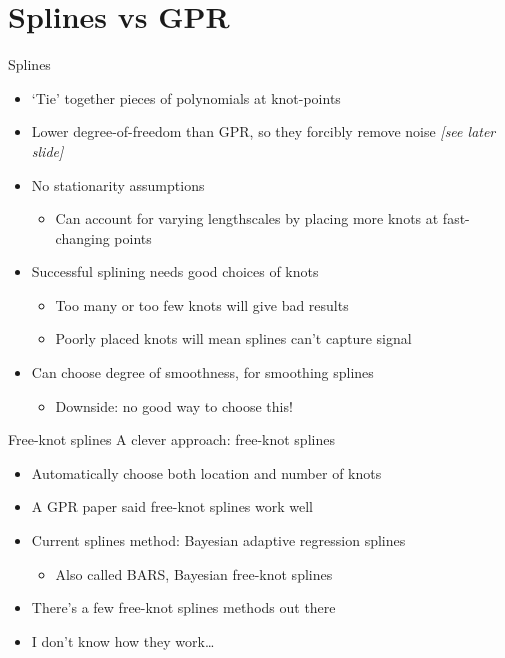 \documentclass[presentation]{beamer}
\begin{document}
\section{Splines vs GPR}
\label{sec:org5209505}
\begin{frame}[label={sec:org2b74fd0}]{Splines}
\begin{itemize}[<+->]
\item `Tie' together pieces of polynomials at knot-points
\item Lower degree-of-freedom than GPR, so they forcibly remove noise \emph{[see later slide]}
\item No stationarity assumptions
\begin{itemize}
\item Can account for varying lengthscales by placing more knots at fast-changing points
\end{itemize}
\item Successful splining needs good choices of knots
\begin{itemize}
\item Too many or too few knots will give bad results
\item Poorly placed knots will mean splines can't capture signal
\end{itemize}
\item Can choose degree of smoothness, for smoothing splines
\begin{itemize}
\item Downside: no good way to choose this!
\end{itemize}
\end{itemize}
\end{frame}


\begin{frame}[label={sec:orgcea1bef}]{Free-knot splines}
A clever approach: free-knot splines
\begin{itemize}[<+->]
\item Automatically choose both location and number of knots
\item A GPR paper said free-knot splines work well
\item Current splines method: Bayesian adaptive regression splines 
\begin{itemize}
\item Also called BARS, Bayesian free-knot splines
\end{itemize}
\item There's a few free-knot splines methods out there
\item I don't know how they work\ldots{}
\end{itemize}
\end{frame}
\end{document}
